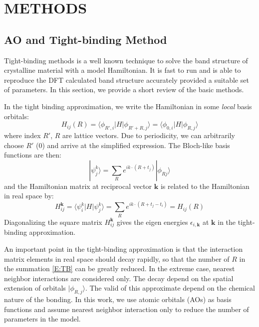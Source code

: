 \documentclass{article}
\begin{document}
\section{METHODS}

\subsection{AO and Tight-binding Method}
Tight-binding methods is a well known technique to solve the band structure of 
crystalline material with a model Hamiltonian\cite{ziman_principles_1999}. 
It is fast to run and is able to reproduce the DFT calculated band structure accurately 
provided a suitable set of parameters. In this section, we provide a short review of the 
basic methods.

In the tight binding approximation, we write the Hamiltonian in some \emph{local}
basis orbitals:
\begin{equation}
    H_{ij}(R) = \langle \phi_{R',i} | H | \phi_{R'+R,j} \rangle = \langle \phi_{0,i} | H | \phi_{R,j} \rangle
\end{equation}
where index $R'$, $R$ are lattice vectors. Due to periodicity, we can arbitrarily choose $R'$ (0) 
and arrive at the simplified expression.
The Bloch-like basis functions are then:
\begin{equation}
    |\psi_j^k\rangle = \sum_R e^{ik\cdot(R+t_j)} |\phi_{Rj} \rangle
\end{equation}
and the Hamiltonian matrix at reciprocal vector $\mathbf{k}$ is related to the 
Hamiltonian in real space by:
\begin{equation}
    \label{E:TB}
    H_{ij}^{\mathbf{k}} = \langle \psi_i^k | H |\psi_j^k\rangle = \sum_R e^{ik\cdot(R+t_j-t_i)} = H_{ij}(R)
\end{equation}
Diagonalizing the square matrix $H_{ij}^{\mathbf{k}}$ gives the eigen energies $\epsilon_{i,\mathbf{k}}$ 
at $\mathbf{k}$ in the tight-binding approximation. 

An important point in the tight-binding approximation is that the interaction matrix elements in real
space should decay rapidly, so that the number of $R$ in the summation \eqref{E:TB} can be greatly 
reduced. In the extreme case, nearest neighbor interactions are considered only. 
The decay depend on the spatial extension of orbitals $|\phi_{R,j}\rangle$. 
The valid of this approximate depend on the chemical nature of the bonding. In this work, we use 
atomic orbitals (AOs) as basis functions and assume nearest neighbor interaction only to reduce the 
number of parameters in the model. 
\end{document}
